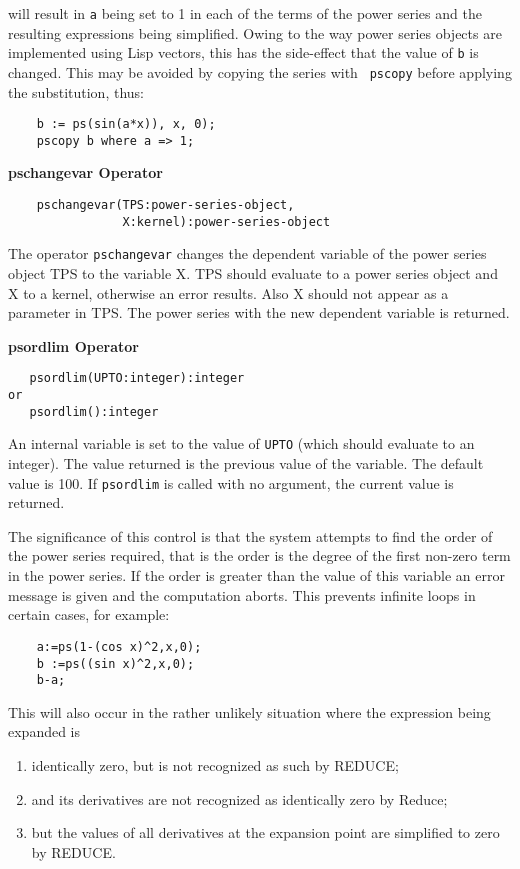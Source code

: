 will result in \texttt{a} being set to 1 in each of the terms of the
power series and the resulting expressions being simplified. Owing to
the way power series objects are implemented using Lisp vectors, this
has the side-effect that the value of \texttt{b} is changed.  This may be
avoided by copying the series with \texttt{ pscopy} before applying the
substitution, thus:
\begin{verbatim}
    b := ps(sin(a*x)), x, 0);
    pscopy b where a => 1;
\end{verbatim}

\textbf{pschangevar Operator}
\hypertarget{operator:PSCHANGEVAR}{}
\begin{verbatim}
    pschangevar(TPS:power-series-object,
                X:kernel):power-series-object
\end{verbatim}
The operator \texttt{pschangevar} changes the dependent variable of the
power series object TPS to the variable X. TPS should evaluate to a power
series object and X to a kernel, otherwise an error results.
Also X should not appear as a parameter in TPS. The power series with the new
dependent variable is returned.

\textbf{psordlim Operator}
\hypertarget{operator:PSORDLIM}{}
\begin{verbatim}
   psordlim(UPTO:integer):integer
or
   psordlim():integer
\end{verbatim}
An internal variable is set to the value of \texttt{UPTO} (which should
evaluate to an integer). The value returned is the previous value of
the variable.  The default value is 100.  If \texttt{psordlim} is called
with no argument, the current value is returned.

The significance of this control is that the system attempts to find
the order of the power series required, that is the order is the
degree of the first non-zero term in the power series.  If the order
is greater than the value of this variable an error message is given
and the computation aborts. This prevents infinite loops in certain cases,
for example:
\begin{verbatim}
    a:=ps(1-(cos x)^2,x,0);
    b :=ps((sin x)^2,x,0);
    b-a;
\end{verbatim}
This will also occur in the rather unlikely situation where the expression
being expanded is
\begin{enumerate}
\item identically zero, but is not recognized as such by REDUCE;
\item and its derivatives are not recognized as identically zero by Reduce;
\item  but the values of all derivatives at the expansion point are
simplified to zero by REDUCE.
\end{enumerate}



